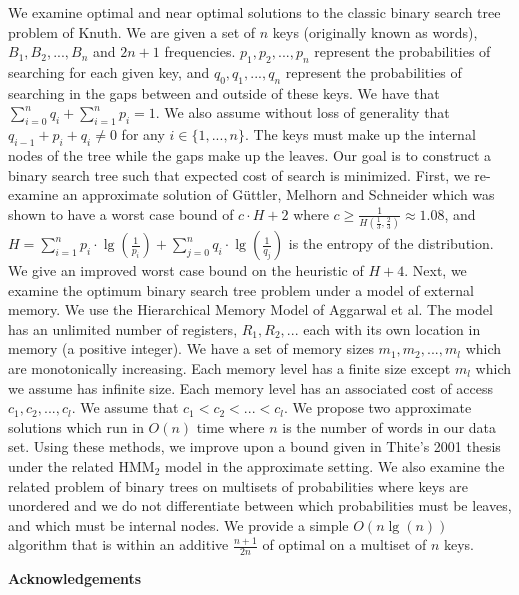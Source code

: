 We examine optimal and near optimal solutions to the classic binary search tree problem of Knuth. We are given a set of $n$ keys (originally known as words), $B_1, B_2, ..., B_n$ and $2n+1$ frequencies. ${p_1, p_2, ..., p_n}$ represent the probabilities of searching for each given key, and ${q_0, q_1, ..., q_n}$ represent the probabilities of searching in the gaps between and outside of these keys. We have that $\sum\limits_{i=0}^n q_i + \sum\limits_{i=1}^n p_i = 1$. We also assume without loss of generality that $q_{i-1}+p_i+q_i \neq 0$ for any $i \in \{1,...,n\}$. The keys must make up the internal nodes of the tree while the gaps make up the leaves. Our goal is to construct a binary search tree such that expected cost of search is minimized. First, we re-examine an approximate solution of G{\"u}ttler, Melhorn and Schneider which was shown to have a worst case bound of $c \cdot H + 2$ where $c \geq \frac{1}{H(\frac{1}{3},\frac{2}{3})} \approx 1.08$, and $H = \sum_{i=1}^{n} p_i\cdot\lg(\frac{1}{p_i}) + \sum_{j=0}^{n} q_i\cdot\lg(\frac{1}{q_j})$ is the entropy of the distribution. We give an improved worst case bound on the heuristic of $H+4$. Next, we examine the optimum binary search tree problem under a model of external memory. We use the Hierarchical Memory Model of Aggarwal et al. The model has an unlimited number of registers, $R_1, R_2, ...$ each with its own location in memory (a positive integer). We have a set of memory sizes $m_1, m_2, ..., m_l$ which are monotonically increasing. Each memory level has a finite size except $m_l$ which we assume has infinite size. Each memory level has an associated cost of access $c_1, c_2, ..., c_l$. We assume that $c_1 < c_2 < ... < c_l$. We propose two approximate solutions which run in $O(n)$ time where $n$ is the number of words in our data set. Using these methods, we improve upon a bound given in Thite's 2001 thesis under the related HMM$_2$ model in the approximate setting. We also examine the related problem of binary trees on multisets of probabilities where keys are unordered and we do not differentiate between which probabilities must be leaves, and which must be internal nodes. We provide a simple $O(n \lg(n))$ algorithm that is within an additive $\frac{n+1}{2n}$ of optimal on a multiset of $n$ keys.

\cleardoublepage


\begin{center}\textbf{Acknowledgements}\end{center}

